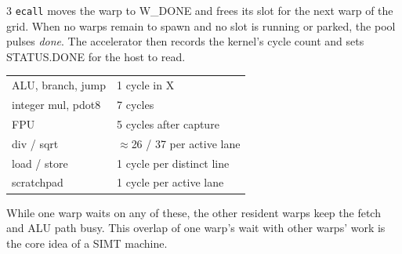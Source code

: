 \begin{multicols*}{3}
\texttt{ecall} moves the warp to W\_DONE and frees its slot for the next warp of the grid. When no warps remain to spawn and no slot is running or parked, the pool pulses \emph{done}. The accelerator then records the kernel's cycle count and sets STATUS.DONE for the host to read.

\begin{tabular}{@{}l@{\quad}l@{}}
ALU, branch, jump & 1 cycle in X\\
integer mul, pdot8 & 7 cycles\\
FPU & 5 cycles after capture\\
div / sqrt & $\approx$26 / 37 per active lane\\
load / store & 1 cycle per distinct line\\
scratchpad & 1 cycle per active lane\\
\end{tabular}

\smallskip
While one warp waits on any of these, the other resident warps keep the fetch and ALU path busy. This overlap of one warp's wait with other warps' work is the core idea of a SIMT machine.

\end{multicols*}
